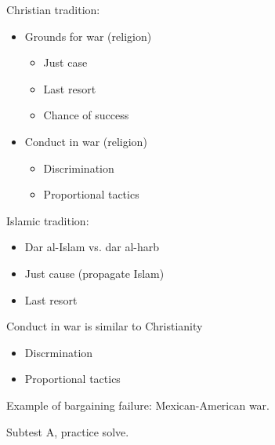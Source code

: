 \documentclass{article}
\begin{document}
  Christian tradition:
  \begin{itemize}
    \item Grounds for war (religion)
      \begin{itemize}
        \item Just case
        \item Last resort
        \item Chance of success
      \end{itemize}
    \item Conduct in war (religion)
      \begin{itemize}
        \item Discrimination
        \item Proportional tactics
      \end{itemize}
    \end{itemize}

    Islamic tradition:
    \begin{itemize}
      \item Dar al-Islam vs. dar al-harb
      \item Just cause (propagate Islam)
      \item Last resort 
    \end{itemize}

    Conduct in war is similar to Christianity
    \begin{itemize}
      \item Discrmination
      \item Proportional tactics
    \end{itemize}


  Example of bargaining failure: Mexican-American war.

  Subtest A, practice solve.
\end{document}
